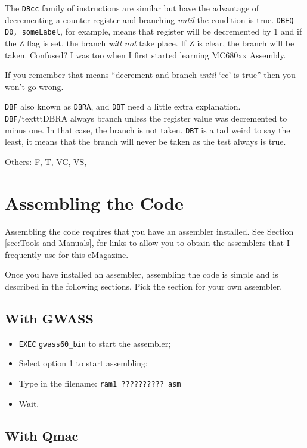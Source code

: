 The \texttt{DBcc} family of instructions are similar but have the advantage of decrementing a counter register and branching \emph{until} the condition is true. \texttt{DBEQ D0, someLabel}, for example, means that register  will be decremented by 1 and if the Z flag is set, the branch \emph{will not} take place. If Z is clear, the branch will be taken. Confused? I was too when I first started learning MC680xx Assembly.

If you remember that  means ``decrement and branch \emph{until} `cc' is true'' then you won't go wrong.

\texttt{DBF} also known as \texttt{DBRA}, and \texttt{DBT} need a little extra explanation. \texttt{DBF}/texttt{DBRA} always branch unless the register value was decremented to minus one. In that case, the branch is not taken. \texttt{DBT} is a tad weird to say the least, it means that the branch will never be taken as the test always is true.



Others: F, T, VC, VS,

\section{Assembling the Code}

Assembling the code requires that you have an assembler installed.
See Section \ref{sec:Tools-and-Manuals}, 
for links to allow you to obtain the assemblers that I frequently
use for this eMagazine.

Once you have installed an assembler, assembling the code is simple
and is described in the following sections. Pick the section for your
own assembler.

\subsection{With GWASS}
\begin{itemize}
\item \texttt{EXEC} \texttt{gwass60\_bin} to start the assembler;
\item Select option 1 to start assembling;
\item Type in the filename: \texttt{ram1\_??????????\_asm}
\item Wait.
\end{itemize}

\subsection{With Qmac}

